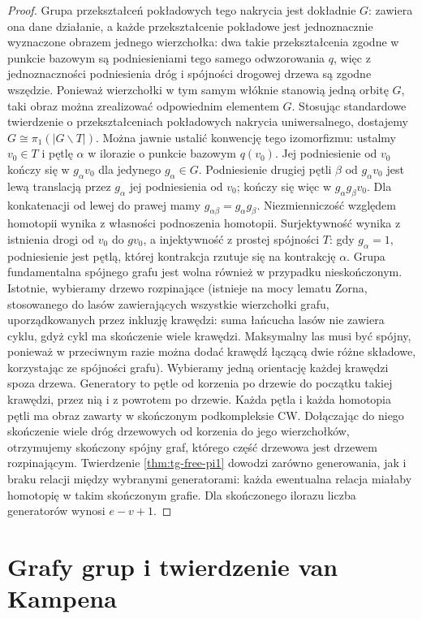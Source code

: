 \begin{proof}
Grupa przekształceń pokładowych tego nakrycia
jest dokładnie $G$: zawiera ona dane działanie,
a każde przekształcenie pokładowe jest jednoznacznie
wyznaczone obrazem jednego wierzchołka: dwa takie
przekształcenia zgodne w punkcie bazowym są
podniesieniami tego samego odwzorowania $q$,
więc z jednoznaczności podniesienia dróg i spójności
drogowej drzewa są zgodne wszędzie.
Ponieważ wierzchołki w tym samym włóknie
stanowią jedną orbitę $G$, taki obraz można
zrealizować odpowiednim elementem $G$.
Stosując standardowe twierdzenie o przekształceniach
pokładowych nakrycia uniwersalnego, dostajemy
$G\cong\pi_1(|G\backslash T|)$.
Można jawnie ustalić konwencję tego izomorfizmu:
ustalmy $v_0\in T$ i pętlę $\alpha$ w ilorazie
o punkcie bazowym $q(v_0)$. Jej podniesienie
od $v_0$ kończy się w $g_\alpha v_0$ dla jedynego
$g_\alpha\in G$. Podniesienie drugiej pętli $\beta$
od $g_\alpha v_0$ jest lewą translacją przez
$g_\alpha$ jej podniesienia od $v_0$; kończy się
więc w $g_\alpha g_\beta v_0$. Dla konkatenacji
od lewej do prawej mamy
$g_{\alpha\beta}=g_\alpha g_\beta$.
Niezmienniczość względem homotopii wynika
z własności podnoszenia homotopii. Surjektywność
wynika z istnienia drogi od $v_0$ do $gv_0$,
a injektywność z prostej spójności $T$:
gdy $g_\alpha=1$, podniesienie jest pętlą,
której kontrakcja rzutuje się na kontrakcję $\alpha$.
Grupa fundamentalna spójnego grafu jest wolna
również w przypadku nieskończonym. Istotnie,
wybieramy drzewo rozpinające (istnieje na mocy
lematu Zorna, stosowanego do lasów zawierających
wszystkie wierzchołki grafu, uporządkowanych
przez inkluzję krawędzi: suma łańcucha lasów
nie zawiera cyklu, gdyż cykl ma skończenie wiele
krawędzi. Maksymalny las musi być spójny, ponieważ
w przeciwnym razie można dodać krawędź łączącą
dwie różne składowe, korzystając ze spójności grafu). Wybieramy jedną orientację każdej
krawędzi spoza drzewa. Generatory to pętle od
korzenia po drzewie do początku takiej krawędzi,
przez nią i z powrotem po drzewie.
Każda pętla i każda homotopia pętli ma obraz
zawarty w skończonym podkompleksie CW.
Dołączając do niego skończenie wiele dróg drzewowych
od korzenia do jego wierzchołków, otrzymujemy
skończony spójny graf, którego część drzewowa jest
drzewem rozpinającym. Twierdzenie
\ref{thm:tg-free-pi1} dowodzi zarówno generowania,
jak i braku relacji między wybranymi generatorami:
każda ewentualna relacja miałaby homotopię
w takim skończonym grafie. Dla skończonego ilorazu
liczba generatorów wynosi $e-v+1$.
\end{proof}

\section{Grafy grup i twierdzenie van Kampena}
\label{sec:tg-graphs-of-groups}

